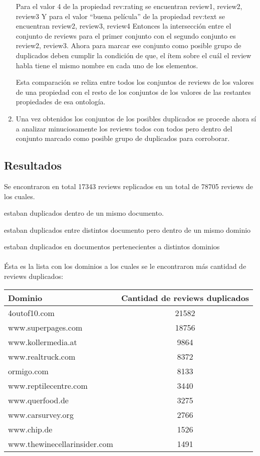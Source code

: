 \begin{enumerate}
Para el valor 4 de la propiedad rev:rating se encuentran {review1, review2, review3}
Y para el valor ``buena película'' de la propiedad rev:text se encuentran {review2, review3, review4}
Entonces la intersección entre el conjunto de reviews para el primer conjunto con el segundo conjunto es {review2, review3}.
Ahora para marcar ese conjunto como posible grupo de duplicados deben cumplir la condición de que, el ítem sobre el cuál el review habla
tiene el mismo nombre en cada uno de los elementos.

Esta comparación se reliza entre todos los conjuntos de reviews de los valores de una propiedad con el resto de los conjuntos de los valores de las restantes propiedades de esa ontología.

\item Una vez obtenidos los conjuntos de los posibles duplicados se procede ahora sí a analizar minuciosamente los reviews todos con todos pero dentro del conjunto marcado como posible grupo de duplicados
para corroborar.
\end{enumerate}

\subsection*{Resultados}

Se encontraron en total 17343 reviews replicados en un total de 78705 reviews de los cuales.

 estaban duplicados dentro de un mismo documento.

 estaban duplicados entre distintos documento pero dentro de un mismo dominio

 estaban duplicados en documentos pertenecientes a distintos dominios
\\\\
Ésta es la lista con los dominios a los cuales se le encontraron más cantidad de reviews duplicados:

\begin{tabular}{| l | c | }\hline
Dominio & Cantidad de reviews duplicados \\\hline
4outof10.com &	21582\\
www.superpages.com &	18756\\
www.kollermedia.at &	9864\\
www.realtruck.com &	8372\\
ormigo.com &	8133\\
www.reptilecentre.com &	3440\\
www.querfood.de &	3275\\
www.carsurvey.org &	2766\\
www.chip.de &	1526\\
www.thewinecellarinsider.com &	1491\\\hline
\end{tabular}

